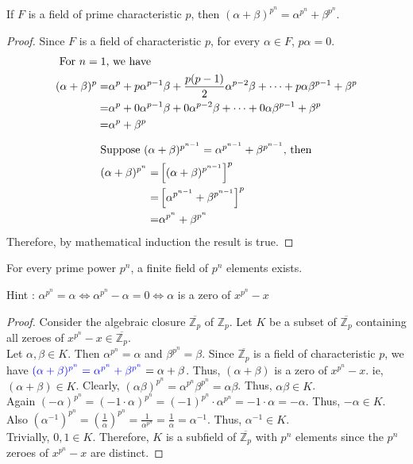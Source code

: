 \begin{lemma}
	If $F$ is a field of prime characteristic $p$, then $(\alpha+\beta)^{p^n} = \alpha^{p^n} + \beta^{p^n}$.
\end{lemma}
\begin{proof}
	Since $F$ is a field of characteristic $p$, for every $\alpha \in F$, $p\alpha = 0$.
	\begin{align*}
		\intertext{ For $n=1$, we have }
		(\alpha+\beta)^p = & \alpha^p + p \alpha^{p-1}\beta+ \frac{p(p-1)}{2} \alpha^{p-2} \beta + \dots + p \alpha \beta^{p-1} + \beta^p \\
		= &  \alpha^p + 0 \alpha^{p-1}\beta+ 0 \alpha^{p-2} \beta + \dots + 0 \alpha \beta^{p-1} + \beta^p \\
		= & \alpha^p + \beta^p
	\end{align*}
	\begin{align*}
		\intertext{Suppose $(\alpha+\beta)^{p^{n-1}} = \alpha^{p^{n-1}} + \beta^{p^{n-1}}$, then} 
		(\alpha+\beta)^{p^n} = & \left[ (\alpha+\beta)^{p^{n-1}} \right]^p \\
		= & \left[ \alpha^{p^{n-1}} + \beta^{p^{n-1}} \right]^p \\
		= & \alpha^{p^n} + \beta^{p^n}
	\end{align*}
	Therefore, by mathematical induction the result is true.
\end{proof}

\begin{theorem}
	For every prime power $p^n$, a finite field of $p^n$ elements exists.
\end{theorem}
{\color{blue} Hint : $\alpha^{p^n} = \alpha \iff \alpha^{p^n} - \alpha = 0 \iff \alpha$ is a zero of $x^{p^n} - x$}
\begin{proof}
	Consider the algebraic closure $\overline{\mathbb{Z}_p}$ of $\mathbb{Z}_p$.
	Let $K$ be a subset of $\overline{\mathbb{Z}_p}$ containing all zeroes of $x^{p^n}-x \in \overline{\mathbb{Z}_p}$.\\
	
	Let $\alpha, \beta \in K$.
	Then $\alpha^{p^n} = \alpha$ and $\beta^{p^n} = \beta$.
	Since $\overline{\mathbb{Z}_p}$ is a field of characteristic $p$, we have ${\color{blue}(\alpha+\beta)^{p^n} = \alpha^{p^n}+ \beta^{p^n}} = \alpha + \beta$.
	Thus, $(\alpha+\beta)$ is a zero of $x^{p^n}-x$.
	ie, $(\alpha + \beta) \in K$.
	Clearly, $(\alpha\beta)^{p^n} = \alpha^{p^n} \beta^{p^n} = \alpha\beta$.
	Thus, $\alpha\beta \in K$.\\


	Again $(-\alpha)^{p^n} = (-1 \cdot \alpha)^{p^n} = (-1)^{p^n} \cdot \alpha^{p^n} = -1 \cdot \alpha = -\alpha$.
	Thus, $-\alpha \in K$.
	Also $(\alpha^{-1})^{p^n} = \left( \frac{1}{\alpha} \right)^{p^n} = \frac{1}{\alpha^{p^n}} = \frac{1}{\alpha} = \alpha^{-1}$.
	Thus, $\alpha^{-1} \in K$.\\
	

	Trivially, $0,1 \in K$.
	Therefore, $K$ is a subfield of $\overline{\mathbb{Z}_p}$ with $p^n$ elements since {\color{blue}the $p^n$ zeroes of $x^{p^n}-x$ are distinct}.
\end{proof}

